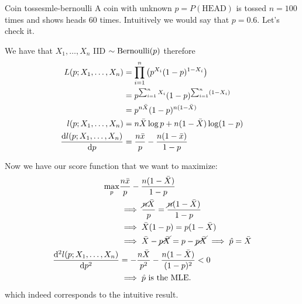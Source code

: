 \documentclass[12pt]{extarticle}
\newcommand{\Bernoulli}{{\operatorfont Bernoulli}}
\begin{document}
\begin{example}{Coin tosses}{mle-bernoulli}
    A coin with unknown $p = P(\text{HEAD})$ is tossed $n = 100$ times and shows heads $60$ times.
    Intuitively we would say that $p = 0.6$.
    Let's check it.

    We have that $X_1, \dots, X_n$ IID $\sim \Bernoulli(p)$ therefore
    \begin{align}
        L(p; X_1, \dots, X_n)         & = \prod_{i = 1}^n \left( p^{X_i} (1 - p)^{1-X_i} \right)   \\
                                      & = p ^{\sum_{i = 1}^n X_i} (1-p) ^{\sum_{i = 1}^n (1- X_i)} \\
                                      & = p^{n \bar X} (1-p)^{n(1-\bar{X})}                        \\
        l(p; X_1, \dots, X_n)         & = n \bar X \log p + n(1- \bar{X}) \log(1-p)                \\
        \dv{l(p; X_1, \dots, X_n)}{p} & = \frac{n \bar x}{p} - \frac{n(1-\bar{x})}{1-p}
    \end{align}

    Now we have our score function that we want to maximize:
    \begin{align}
        \max_p                           & \frac{n \bar x}{p} - \frac{n(1-\bar{X})}{1-p}                             \\
                                         & \implies \frac{\cancel {n} \bar X}{p} = \frac{\cancel{n}(1-\bar{X})}{1-p} \\
                                         & \implies \bar{X} (1-p) = p (1-\bar X)                                     \\
                                         & \implies \bar{X} -\cancel{p\bar{X}} = p -\cancel{p\bar{X}}
        \implies \hat p = \bar{X}                                                                                    \\
        \dv[2]{l(p; X_1, \dots, X_n)}{p} & = -\frac{n \bar{X}}{p^2} - \frac{n(1-\bar X)}{(1-p)^2} < 0                \\
                                         & \implies \hat p \text{ is the MLE.}
    \end{align}
    which indeed corresponds to the intuitive result.
\end{example}
\end{document}
